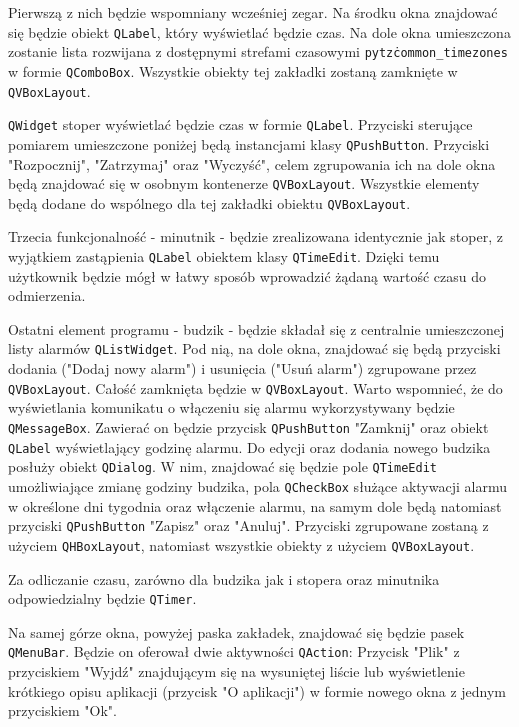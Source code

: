 \documentclass[11pt]{article}
\begin{document}
    Pierwszą z nich będzie wspomniany wcześniej zegar. Na środku okna znajdować się będzie obiekt \texttt{QLabel},
    który wyświetlać będzie czas. Na dole okna umieszczona zostanie lista rozwijana z dostępnymi strefami czasowymi 
    \texttt{pytz\.common\_timezones} w formie \texttt{QComboBox}. Wszystkie obiekty tej zakładki zostaną zamknięte
    w \texttt{QVBoxLayout}.

    \texttt{QWidget} stoper wyświetlać będzie czas w formie \texttt{QLabel}. Przyciski sterujące
    pomiarem umieszczone poniżej będą instancjami klasy \texttt{QPushButton}. Przyciski "Rozpocznij", "Zatrzymaj" oraz "Wyczyść", celem
    zgrupowania ich na dole okna będą znajdować się w osobnym kontenerze \texttt{QVBoxLayout}. Wszystkie
    elementy będą dodane do wspólnego dla tej zakładki obiektu \texttt{QVBoxLayout}.

    Trzecia funkcjonalność - minutnik - będzie zrealizowana identycznie jak stoper, z wyjątkiem
    zastąpienia \texttt{QLabel} obiektem klasy \texttt{QTimeEdit}. Dzięki temu użytkownik będzie mógł
    w łatwy sposób wprowadzić żądaną wartość czasu do odmierzenia.

    Ostatni element programu - budzik - będzie składał się z centralnie umieszczonej listy alarmów
    \texttt{QListWidget}. Pod nią, na dole okna, znajdować się będą przyciski dodania ("Dodaj nowy alarm") i usunięcia ("Usuń alarm") zgrupowane przez
    \texttt{QVBoxLayout}. Całość zamknięta będzie w \texttt{QVBoxLayout}. Warto wspomnieć, że do wyświetlania komunikatu o włączeniu się alarmu wykorzystywany będzie
    \texttt{QMessageBox}. Zawierać on będzie przycisk \texttt{QPushButton} "Zamknij" oraz obiekt \texttt{QLabel} wyświetlający godzinę alarmu.
    Do edycji oraz dodania nowego budzika posłuży obiekt \texttt{QDialog}. W nim, znajdować się będzie pole \texttt{QTimeEdit} umożliwiające zmianę godziny budzika,
    pola \texttt{QCheckBox} służące aktywacji alarmu w określone dni tygodnia oraz włączenie alarmu, na samym dole będą natomiast przyciski \texttt{QPushButton} "Zapisz"
    oraz "Anuluj". Przyciski zgrupowane zostaną z użyciem \texttt{QHBoxLayout}, natomiast wszystkie obiekty z użyciem \texttt{QVBoxLayout}.

    Za odliczanie czasu, zarówno dla budzika jak i stopera oraz minutnika odpowiedzialny będzie \texttt{QTimer}.

    Na samej górze okna, powyżej paska zakładek, znajdować się będzie pasek \texttt{QMenuBar}. 
    Będzie on oferował dwie aktywności \texttt{QAction}: Przycisk "Plik" z przyciskiem "Wyjdź" znajdującym się na wysuniętej liście lub
    wyświetlenie krótkiego opisu aplikacji (przycisk "O aplikacji") w formie nowego okna z jednym przyciskiem "Ok".
\end{document}
